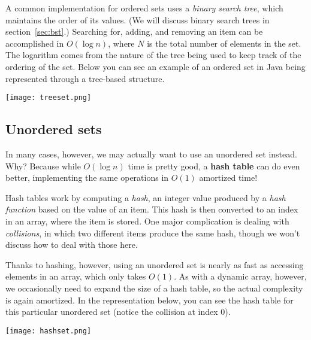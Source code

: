 A common implementation for ordered sets uses a \textit{binary search tree}, which maintains the order of its values. (We will discuss binary search trees in section~\ref{sec:bst}.) Searching for, adding, and removing an item can be accomplished in $O(\log n)$, where $N$ is the total number of elements in the set. The logarithm comes from the nature of the tree being used to keep track of the ordering of the set. Below you can see an example of an ordered set in Java being represented through a tree-based structure.

\texttt{[image: treeset.png]}


\subsection{Unordered sets}

In many cases, however, we may actually want to use an unordered set instead. Why? Because while $O(\log n)$ time is pretty good, a \textbf{hash table} can do even better, implementing the same operations in $O(1)$ amortized time!

Hash tables work by computing a \textit{hash}, an integer value produced by a \textit{hash function} based on the value of an item. This hash is then converted to an index in an array, where the item is stored. One major complication is dealing with \textit{collisions}, in which two different items produce the same hash, though we won't discuss how to deal with those here.

Thanks to hashing, however, using an unordered set is nearly as fast as accessing elements in an array, which only takes $O(1)$. As with a dynamic array, however, we occasionally need to expand the size of a hash table, so the actual complexity is again amortized. In the representation below, you can see the hash table for this particular unordered set (notice the collision at index 0).

\texttt{[image: hashset.png]} 


